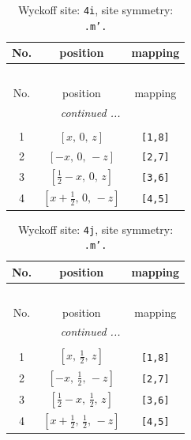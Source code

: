 \documentclass[fleqn,8pt]{jsarticle}
\begin{document}
\renewcommand{\arraystretch}{1.2}
\begin{longtable}{ccc}
\caption{Wyckoff site: {\tt 4i}, site symmetry: {\tt .m'.}}
 \\
 \hline \hline
No. & position & mapping \\ \hline \endfirsthead

\multicolumn{2}{l}{\tablename\ \thetable{}} \\
 \hline \hline
No. & position & mapping \\ \hline \endhead

 \hline \hline
\multicolumn{2}{r}{\footnotesize\it continued ...} \\ \endfoot

 \hline \hline
\multicolumn{2}{r}{} \\ \endlastfoot

1 & $\left[ x,\, 0,\, z \right]$ & {\tt [1,8]} \\ \hline
2 & $\left[ - x,\, 0,\, - z \right]$ & {\tt [2,7]} \\ \hline
3 & $\left[ \frac{1}{2} - x,\, 0,\, z \right]$ & {\tt [3,6]} \\ \hline
4 & $\left[ x + \frac{1}{2},\, 0,\, - z \right]$ & {\tt [4,5]} \\
\end{longtable}
\renewcommand{\arraystretch}{1.2}
\begin{longtable}{ccc}
\caption{Wyckoff site: {\tt 4j}, site symmetry: {\tt .m'.}}
 \\
 \hline \hline
No. & position & mapping \\ \hline \endfirsthead

\multicolumn{2}{l}{\tablename\ \thetable{}} \\
 \hline \hline
No. & position & mapping \\ \hline \endhead

 \hline \hline
\multicolumn{2}{r}{\footnotesize\it continued ...} \\ \endfoot

 \hline \hline
\multicolumn{2}{r}{} \\ \endlastfoot

1 & $\left[ x,\, \frac{1}{2},\, z \right]$ & {\tt [1,8]} \\ \hline
2 & $\left[ - x,\, \frac{1}{2},\, - z \right]$ & {\tt [2,7]} \\ \hline
3 & $\left[ \frac{1}{2} - x,\, \frac{1}{2},\, z \right]$ & {\tt [3,6]} \\ \hline
4 & $\left[ x + \frac{1}{2},\, \frac{1}{2},\, - z \right]$ & {\tt [4,5]} \\
\end{longtable}
\end{document}
